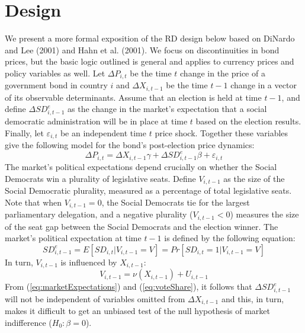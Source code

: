 \documentclass[12pt]{article}
\begin{document}
\section{Design}
We present a more formal exposition of the RD design below based on DiNardo and Lee (2001) and Hahn et al. (2001). We focus on discontinuities in bond prices, but the basic logic outlined is general and applies to currency prices and policy variables as well. Let $\Delta P_{i,t}$ be the time $t$ change in the price of a government bond in country $i$ and $\Delta X_{i,t-1}$ be the time $t-1$ change in a vector of its observable determinants. Assume that an election is held at time $t-1$, and define $\Delta SD^e_{i,t-1}$ as the change in the market's expectation that a social democratic administration will be in place at time $t$ based on the election results. Finally, let $\varepsilon_{i,t}$ be an independent time $t$ price shock. Together these variables give the following model for the bond's post-election price dynamics:
\begin{equation}\label{eq:priceMovements}
\Delta P_{i,t} = \Delta X_{i,t-1} \gamma + \Delta SD^e_{i,t-1} \beta + \varepsilon_{i,t}
\end{equation}
The market's political expectations depend crucially on whether the Social Democrats win a plurality of legislative seats. Define $V_{i,t-1}$ as the size of the Social Democratic plurality, measured as a percentage of total legislative seats. Note that when $V_{i,t-1} = 0$, the Social Democrats tie for the largest parliamentary delegation, and a negative plurality ($V_{i,t-1} < 0$) measures the size of the seat gap between the Social Democrats and the election winner. The market's political expectation at time $t-1$ is defined by the following equation: 
\begin{equation}\label{eq:marketExpectations}
SD^e_{i,t-1} = E\left[SD_{i,t}|V_{i,t-1} = V\right] = Pr\left[SD_{i,t} = 1 | V_{i,t-1} = V\right]
\end{equation}
In turn, $V_{i,t-1}$ is influenced by $X_{i,t-1}$:
\begin{equation} \label{eq:voteShare}
V_{i,t-1} = \nu(X_{i,t-1}) + U_{i,t-1}
\end{equation}
From (\ref{eq:marketExpectations}) and (\ref{eq:voteShare}), it follows that $\Delta SD^e_{i,t-1}$ will not be independent of variables omitted from $\Delta X_{i,t-1}$ and this, in turn, makes it difficult to get an unbiased test of the null hypothesis of market indifference ($H_0: \beta = 0$).
\end{document}
